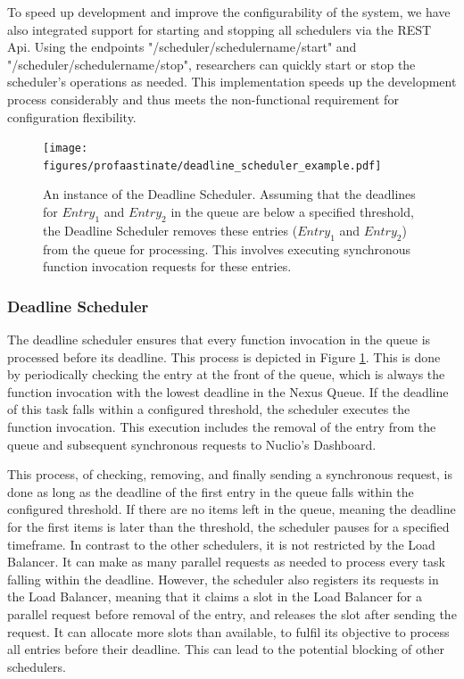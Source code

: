 To speed up development and improve the configurability of the system, we have also integrated support for starting and stopping all schedulers via the REST Api. Using the endpoints "/scheduler/{schedulername}/start" and "/scheduler/{schedulername}/stop", researchers can quickly start or stop the scheduler's operations as needed. This implementation speeds up the development process considerably and thus meets the non-functional requirement for configuration flexibility.

    \begin{figure}
        \centering
        \texttt{[image: figures/profaastinate/deadline\_scheduler\_example.pdf]}
        \caption{An instance of the Deadline Scheduler. Assuming that the deadlines for $Entry_1$ and $Entry_2$ in the queue are below a specified threshold, the Deadline Scheduler removes these entries ($Entry_1$ and $Entry_2$) from the queue for processing. This involves executing synchronous function invocation requests for these entries.}
        \label{fig:deadline-scheduler-example}
    \end{figure}
    \subsubsection{Deadline Scheduler} 
\label{sec:deadline-scheduler}
The deadline scheduler ensures that every function invocation in the queue is processed before its deadline. This process is depicted in Figure \ref{fig:deadline-scheduler-example}. This is done by periodically checking the entry at the front of the queue, which is always the function invocation with the lowest deadline in the Nexus Queue. If the deadline of this task falls within a configured threshold, the scheduler executes the function invocation. This execution includes the removal of the entry from the queue and subsequent synchronous requests to Nuclio's Dashboard.

This process, of checking, removing, and finally sending a synchronous request, is done as long as the deadline of the first entry in the queue falls within the configured threshold. If there are no items left in the queue, meaning the deadline for the first items is later than the threshold, the scheduler pauses for a specified timeframe. In contrast to the other schedulers, it is not restricted by the Load Balancer. It can make as many parallel requests as needed to process every task falling within the deadline. However, the scheduler also registers its requests in the Load Balancer, meaning that it claims a slot in the Load Balancer for a parallel request before removal of the entry, and releases the slot after sending the request. It can allocate more slots than available, to fulfil its objective to process all entries before their deadline. This can lead to the potential blocking of other schedulers.



